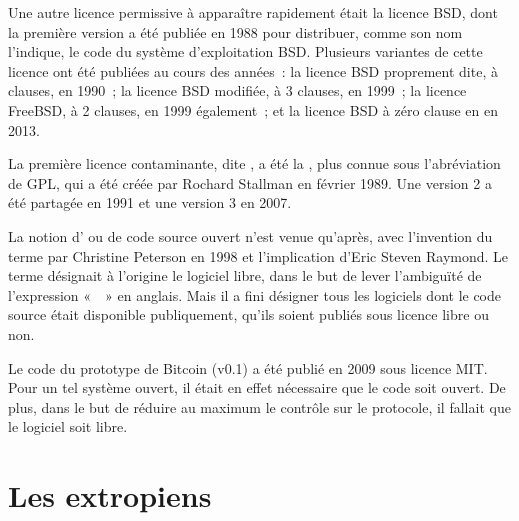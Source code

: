 Une autre licence permissive à apparaître rapidement était la licence BSD, dont la première version a été publiée en 1988 pour distribuer, comme son nom l'indique, le code du système d'exploitation BSD. Plusieurs variantes de cette licence ont été publiées au cours des années~: la licence BSD proprement dite, à  clauses, en 1990~; la licence BSD modifiée, à 3 clauses, en 1999~; la licence FreeBSD, à 2 clauses, en 1999 également~; et la licence BSD à zéro clause en en 2013.

La première licence contaminante, dite , a été la , plus connue sous l'abréviation de GPL, qui a été créée par Rochard Stallman en février 1989. Une version 2 a été partagée en 1991 et une version 3 en 2007.

La notion d' ou de code source ouvert n'est venue qu'après, avec l'invention du terme par Christine Peterson en 1998 et l'implication d'Eric Steven Raymond. Le terme désignait à l'origine le logiciel libre, dans le but de lever l'ambiguïté de l'expression «~~» en anglais. Mais il a fini désigner tous les logiciels dont le code source était disponible publiquement, qu'ils soient publiés sous licence libre ou non.

Le code du prototype de Bitcoin (v0.1) a été publié en 2009 sous licence MIT. Pour un tel système ouvert, il était en effet nécessaire que le code soit ouvert. De plus, dans le but de réduire au maximum le contrôle sur le protocole, il fallait que le logiciel soit libre.


\section*{Les extropiens}

